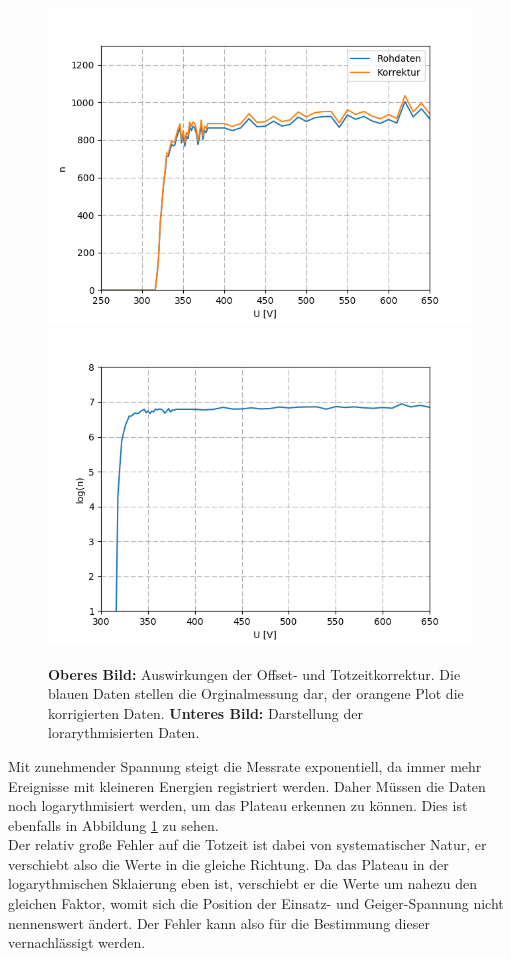 \documentclass[12pt,a4paper]{article}
\begin{document}
\begin{figure}
\centering
\includegraphics[scale=0.9]{Bilder/GMTotzeit.PNG}
\includegraphics[scale=0.9]{Bilder/GMlogroh.PNG}
\caption{\textbf{Oberes Bild:} Auswirkungen der Offset- und Totzeitkorrektur. Die blauen Daten stellen die Orginalmessung dar, der orangene Plot die korrigierten Daten. \textbf{Unteres Bild:} Darstellung der lorarythmisierten Daten.}
\label{fig:GMTotzeit}
\end{figure}

Mit zunehmender Spannung steigt die Messrate exponentiell, da immer mehr Ereignisse mit kleineren Energien registriert werden. Daher Müssen die Daten noch logarythmisiert werden, um das Plateau erkennen zu können. Dies ist ebenfalls in Abbildung \ref{fig:GMTotzeit} zu sehen.\\
Der relativ große Fehler auf die Totzeit ist dabei von systematischer Natur, er verschiebt also die Werte in die gleiche Richtung. Da das Plateau in der logarythmischen Sklaierung eben ist, verschiebt er die Werte um nahezu den gleichen Faktor, womit sich die Position der Einsatz- und Geiger-Spannung nicht nennenswert ändert. Der Fehler kann also für die Bestimmung dieser vernachlässigt werden.
\end{document}
